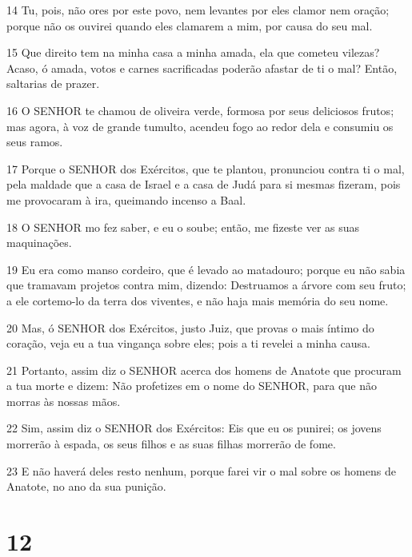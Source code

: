 \par 14 Tu, pois, não ores por este povo, nem levantes por eles clamor nem oração; porque não os ouvirei quando eles clamarem a mim, por causa do seu mal.
\par 15 Que direito tem na minha casa a minha amada, ela que cometeu vilezas? Acaso, ó amada, votos e carnes sacrificadas poderão afastar de ti o mal? Então, saltarias de prazer.
\par 16 O SENHOR te chamou de oliveira verde, formosa por seus deliciosos frutos; mas agora, à voz de grande tumulto, acendeu fogo ao redor dela e consumiu os seus ramos.
\par 17 Porque o SENHOR dos Exércitos, que te plantou, pronunciou contra ti o mal, pela maldade que a casa de Israel e a casa de Judá para si mesmas fizeram, pois me provocaram à ira, queimando incenso a Baal.
\par 18 O SENHOR mo fez saber, e eu o soube; então, me fizeste ver as suas maquinações.
\par 19 Eu era como manso cordeiro, que é levado ao matadouro; porque eu não sabia que tramavam projetos contra mim, dizendo: Destruamos a árvore com seu fruto; a ele cortemo-lo da terra dos viventes, e não haja mais memória do seu nome.
\par 20 Mas, ó SENHOR dos Exércitos, justo Juiz, que provas o mais íntimo do coração, veja eu a tua vingança sobre eles; pois a ti revelei a minha causa.
\par 21 Portanto, assim diz o SENHOR acerca dos homens de Anatote que procuram a tua morte e dizem: Não profetizes em o nome do SENHOR, para que não morras às nossas mãos.
\par 22 Sim, assim diz o SENHOR dos Exércitos: Eis que eu os punirei; os jovens morrerão à espada, os seus filhos e as suas filhas morrerão de fome.
\par 23 E não haverá deles resto nenhum, porque farei vir o mal sobre os homens de Anatote, no ano da sua punição.

\chapter{12}

